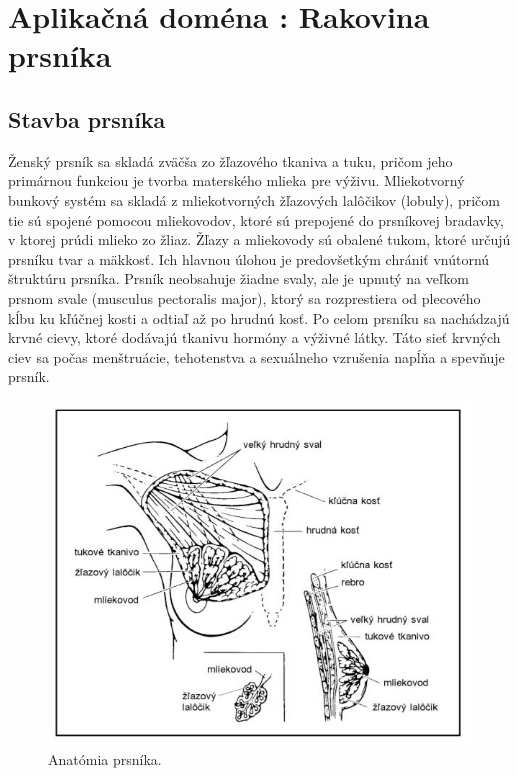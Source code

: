 \section{Aplikačná doména : Rakovina prsníka}

\subsection{Stavba prsníka}
\hspace{10mm}Ženský prsník sa skladá zväčša zo žľazového tkaniva a tuku, pričom jeho primárnou funkciou je tvorba materského mlieka pre výživu. Mliekotvorný bunkový systém sa skladá z mliekotvorných žľazových lalôčikov (lobuly), pričom tie sú spojené pomocou mliekovodov, ktoré sú prepojené do prsníkovej bradavky, v ktorej prúdi mlieko zo žliaz. Žľazy a mliekovody sú obalené tukom, ktoré určujú prsníku tvar a mäkkosť. Ich hlavnou úlohou je predovšetkým chrániť vnútornú štruktúru prsníka. Prsník neobsahuje žiadne svaly, ale je upnutý na veľkom prsnom svale (musculus pectoralis major), ktorý sa rozprestiera od plecového kĺbu ku kľúčnej kosti a odtiaľ až po hrudnú kosť. Po celom prsníku sa nachádzajú krvné cievy, ktoré dodávajú tkanivu hormóny a výživné látky. Táto sieť krvných ciev sa počas menštruácie, tehotenstva a sexuálneho vzrušenia napĺňa a spevňuje prsník. 

\begin{figure}[h!]
\begin{centering}
\includegraphics[width=15cm]{assets/images/242_1.JPG}
\par\end{centering}
\caption{Anatómia prsníka. \label{fig:dynabook}\cite{RAKOVINA-PRSNIKA}}
\end{figure}


